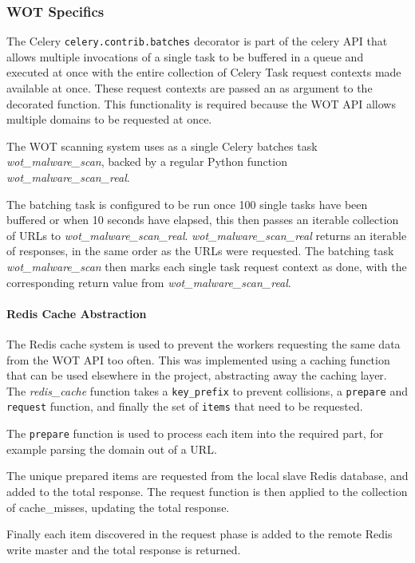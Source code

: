 \subsubsection{WOT Specifics}
The Celery \verb`celery.contrib.batches` decorator is part of the celery API that allows multiple invocations of a single task to be buffered in a queue and executed at once with the entire collection of Celery Task request contexts made available at once. These request contexts are passed an as argument to the decorated function. This functionality is required because the WOT API allows multiple domains to be requested at once.

The WOT scanning system uses as a single Celery batches task \emph{wot\_malware\_scan}, backed by a regular Python function \emph{wot\_malware\_scan\_real}.

The batching task is configured to be run once 100 single tasks have been buffered or when 10 seconds have elapsed, this then passes an iterable collection of URLs to \emph{wot\_malware\_scan\_real}. \emph{wot\_malware\_scan\_real} returns an iterable of responses, in the same order as the URLs were requested. The batching task \emph{wot\_malware\_scan} then marks each single task request context as done, with the corresponding return value from \emph{wot\_malware\_scan\_real}\cite{celery-batches}.

\paragraph{Redis Cache Abstraction}
The Redis cache system is used to prevent the workers requesting the same data from the WOT API too often.  This was implemented using a caching function that can be used elsewhere in the project, abstracting away the caching layer.  The \emph{redis\_cache} function takes a \verb`key_prefix` to prevent collisions, a \verb`prepare` and \verb`request` function, and finally the set of \verb`items` that need to be requested.

The \verb`prepare` function is used to process each item into the required part, for example parsing the domain out of a URL.

The unique prepared items are requested from the local slave Redis database, and added to the total response. The request function is then applied to the collection of cache\_misses, updating the total response.

Finally each item discovered in the request phase is added to the remote Redis write master and the total response is returned.

